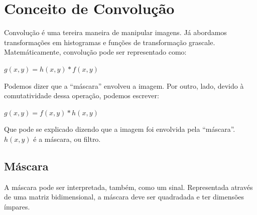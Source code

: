 \documentclass[a4paper, 12pt]{article}
\begin{document}
\section{Conceito de Convolução}
Convolução é uma tereira maneira de manipular imagens. Já abordamos transformações em histogramas e funções de transformação grascale. Matemáticamente, 
convolução pode ser representado como:
\begin{center}
	$g(x, y) = h(x,y) * f(x,y)$
\end{center}
Podemos dizer que a ``máscara'' envolveu a imagem.
Por outro, lado, devido à comutatividade dessa operação, podemos escrever:
\begin{center}
	$g(x, y) = f(x,y) * h(x,y)$
\end{center}
Que pode se explicado dizendo que a imagem foi envolvida pela ``máscara''. $h(x,y)$ é a máscara, ou filtro.

\subsection{Máscara}
A máscara pode ser interpretada, também, como um sinal. Representada através de uma matriz bidimensional, a máscara deve ser quadradada e ter dimensões 
ímpares.
\end{document}
